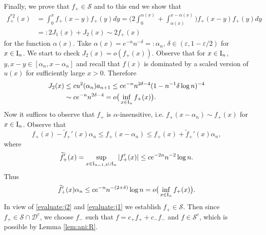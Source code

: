 \documentclass[12pt,leqno]{amsart}
\newcommand{\rI}{{\rm I}}
\newcommand{\wt}{\widetilde}
\newcommand{\vep}{\varepsilon}
\newcommand{\cals}{{\mathcal S}}
\newcommand{\cald}{{\mathcal D}}
\newcommand{\1}{{\mathbf 1}}
\begin{document}
Finally, we prove that $f_+\in \cals$ and to this end we show that %
\begin{align*}
 f_+^{\ast 2}(x)&= \int_0^x f_+(x-y)f_+(y)dy = \Big(
2\int_{0}^{\alpha(x)} +\int_{\alpha(x)}^{x-\alpha(x)}
\Big) f_+(x-y)f_+(y)dy \\
&=: 2J_1(x)+J_2(x)\sim 2f_+(x) 
\end{align*}
for the function $\alpha(x)$. 
Take $\alpha(x) =e^{-n}n^{-\delta}=:\alpha_n,\,\delta\in (\vep,1-\vep/2)$ for $x\in\rI_n$. 
We start to check $J_2(x)=o(f_+(x))$. 
Observe that for $x\in \rI_{n}$, $y,x-y\in [\alpha_n,x-\alpha_n]$ and recall that $f(x)$ is dominated by 
a scaled version of $u(x)$ for sufficiently large $x>0$. Therefore 
\begin{align}
\begin{split}
\label{evaluate:j2}
 J_2(x) &\le c u^{2}(\alpha_n) a_{n+1} \le ce^{-n} n^{2\delta-4} (1-n^{-1}\delta\log n)^{-4} \\
& \sim c e^{-n}n^{2\delta-4} =o\big(\inf_{x\in \rI_n}f_+(x)\big).
\end{split}
\end{align}
Now it suffices to observe that $f_+$ is $\alpha$-insensitive, i.e. $f_+ (x-\alpha_n)\sim f_+(x)$ for $x\in \rI_n$. 
Observe that 
\[
 f_+(x)-\wt f_+'(x)\alpha_n \le f_+(x-\alpha_n) \le f_+(x)+\wt f_+'(x)\alpha_n,
\]
where 
\[
 \wt f_+'(x) =\sup_{x\in \rI_{n-1,3}\cup \rI_n} |f'_+(x)| \le c e^{-2n} n^{-2} \log n . 
\]
Thus 
\begin{align}
\label{evaluate:j1}
 \wt f_+'(x)\alpha_n \le c e^{-n} n^{-(2+\delta)} \log n =o\big(
\inf_{x\in \rI_n} f_+(x)
\big).
\end{align}
In view of \eqref{evaluate:j2} and \eqref{evaluate:j1} we establish $f_+ \in \cals$. 
Then since $f_+\in \cals \cap \cald^c$, we choose $f_-$ such that 
$f=c_+f_++c_-f_-$ and $f\in \cals^c$, which is possible by Lemma \ref{lem:ani:R}. 
\end{document}
